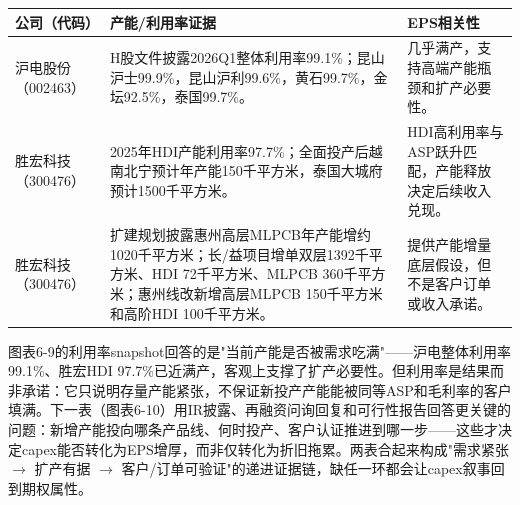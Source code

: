 \begin{exhibitbox}[图表6-9：H股产能利用率和扩产]
\footnotesize
\begin{tabularx}{\textwidth}{L{1.8cm}X X}
\toprule
\textbf{公司（代码）} & \textbf{产能/利用率证据} & \textbf{EPS相关性} \\
\midrule
沪电股份（002463） & H股文件披露2026Q1整体利用率99.1\%；昆山沪士99.9\%，昆山沪利99.6\%，黄石99.7\%，金坛92.5\%，泰国99.7\%。 & 几乎满产，支持高端产能瓶颈和扩产必要性。 \\
胜宏科技（300476） & 2025年HDI产能利用率97.7\%；全面投产后越南北宁预计年产能150千平方米，泰国大城府预计1500千平方米。 & HDI高利用率与ASP跃升匹配，产能释放决定后续收入兑现。 \\
胜宏科技（300476） & 扩建规划披露惠州高层MLPCB年产能增约1020千平方米；长/益项目增单双层1392千平方米、HDI 72千平方米、MLPCB 360千平方米；惠州线改新增高层MLPCB 150千平方米和高阶HDI 100千平方米。 & 提供产能增量底层假设，但不是客户订单或收入承诺。 \\
\bottomrule
\end{tabularx}
\end{exhibitbox}

图表6-9的利用率snapshot回答的是"当前产能是否被需求吃满"——沪电整体利用率99.1\%、胜宏HDI 97.7\%已近满产，客观上支撑了扩产必要性。但利用率是结果而非承诺：它只说明存量产能紧张，不保证新投产产能能被同等ASP和毛利率的客户填满。下一表（图表6-10）用IR披露、再融资问询回复和可行性报告回答更关键的问题：新增产能投向哪条产品线、何时投产、客户认证推进到哪一步——这些才决定capex能否转化为EPS增厚，而非仅转化为折旧拖累。两表合起来构成"需求紧张 $\rightarrow$ 扩产有据 $\rightarrow$ 客户/订单可验证"的递进证据链，缺任一环都会让capex叙事回到期权属性。

